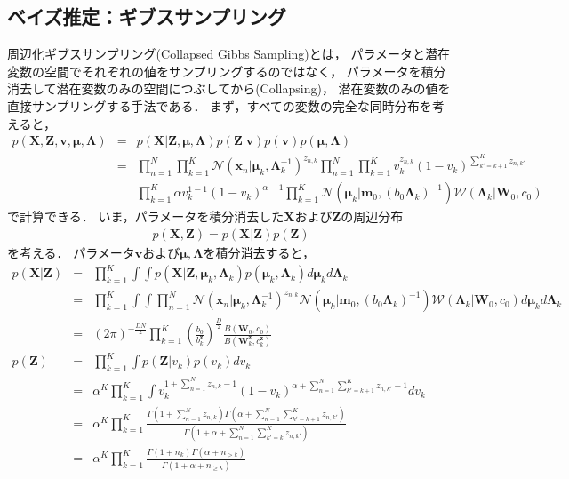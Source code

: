 \subsection{ベイズ推定：ギブスサンプリング}

周辺化ギブスサンプリング(Collapsed Gibbs Sampling)とは，
パラメータと潜在変数の空間でそれぞれの値をサンプリングするのではなく，
パラメータを積分消去して潜在変数のみの空間につぶしてから(Collapsing)，
潜在変数のみの値を直接サンプリングする手法である．
まず，すべての変数の完全な同時分布を考えると，
\begin{eqnarray}
p(\bm{X},\bm{Z},\bm{v},\bm\mu,\bm\Lambda) 
 &=& 
 p(\bm{X}|\bm{Z},\bm\mu,\bm\Lambda)  
 p(\bm{Z}|\bm{v}) 
 p(\bm{v})
 p(\bm\mu,\bm\Lambda) 
 \nonumber \\
 &=&
 \prod_{n=1}^{N} \prod_{k=1}^{K} 
 \mathcal{N}\left(\bm{x}_{n}\big|\bm\mu_{k},\bm\Lambda_{k}^{-1}\right)^{z_{n,k}}
 \prod_{n=1}^{N} 
 \prod_{k=1}^{K}
 v_k^{z_{n,k}} 
 (1 - v_k)^{\sum_{k' = k+1}^{K} z_{n,k'}} \nonumber\\&&
 \prod_{k=1}^{K}
 \alpha v_k^{1-1} (1 - v_k)^{\alpha - 1}
 \prod_{k=1}^{K}
  \mathcal{N}\left(\bm\mu_{k}\big|\bm{m}_0,(b_0\bm\Lambda_{k})^{-1}\right)
  \mathcal{W}\left(\bm\Lambda_{k}\big|\bm{W}_0,c_0\right)
\end{eqnarray}
で計算できる．
いま，パラメータを積分消去した$\bm{X}$および$\bm{Z}$の周辺分布
\begin{eqnarray}
 p(\bm{X},\bm{Z})
  = 
 p(\bm{X}|\bm{Z}) p(\bm{Z})
\end{eqnarray} 
を考える．
パラメータ$\bm{v}$および$\bm\mu,\bm\Lambda$を積分消去すると，
\begin{eqnarray}
 p(\bm{X}|\bm{Z})
  &=&
  \prod_{k=1}^{K}
  \int\!\!\!\!\int
  p(\bm{X}|\bm{Z},\bm\mu_k,\bm\Lambda_k) p(\bm\mu_k,\bm\Lambda_k)
  d\bm\mu_k d\bm\Lambda_k
  \nonumber\\
  &=&
  \prod_{k=1}^{K}
  \int\!\!\!\!\int
  \prod_{n=1}^{N} \mathcal{N}\left(\bm{x}_{n}\big|\bm\mu_{k},\bm\Lambda_{k}^{-1}\right)^{z_{n,k}}
  \mathcal{N}\left(\bm\mu_{k}\big|\bm{m}_0,(b_0\bm\Lambda_{k})^{-1}\right)
  \mathcal{W}\left(\bm\Lambda_{k}\big|\bm{W}_0,c_0\right)
  d\bm\mu_k d\bm\Lambda_k
  \nonumber\\
  &=&
  (2\pi)^{-\frac{DN}{2}} \prod_{k=1}^{K}
  \left(\frac{b_0}{b_k^{\bm{z}}}\right)^{\frac{D}{2}} 
  \frac{B(\bm{W}_0,c_0)}{B(\bm{W}_k^{\bm{z}},c_k^{\bm{z}})}
  \\
 p(\bm{Z})
  &=&
\prod_{k=1}^{K}
  \int  p(\bm{Z}|v_k) p(v_k) dv_k
  \nonumber \\
  &=&
  \alpha^{K} \prod_{k=1}^{K}
  \int
  v_k^{1 + \sum_{n = 1}^{N} z_{n,k} - 1}
  (1 - v_k)^{\alpha + \sum_{n = 1}^{N} \sum_{k' = k+1}^{K} z_{n,k'} - 1}
  dv_k
  \nonumber \\
  &=&
  \alpha^{K} \prod_{k=1}^{K}
  \frac{\Gamma\left(1 + \sum_{n = 1}^{N} z_{n,k}\right)
        \Gamma\left(\alpha + \sum_{n = 1}^{N} \sum_{k' = k+1}^{K} z_{n,k'}\right)}
       {\Gamma\left(1 + \alpha + \sum_{n = 1}^{N} \sum_{k' = k}^{K} z_{n,k'}\right)}
  \nonumber \\
  &=&
  \alpha^{K} \prod_{k=1}^{K}
  \frac{\Gamma\left(1 + n_{k}\right)
        \Gamma\left(\alpha + n_{>k}\right)}
       {\Gamma\left(1 + \alpha + n_{\ge k}\right)}
  \label{eq:cpxz}
\end{eqnarray}
